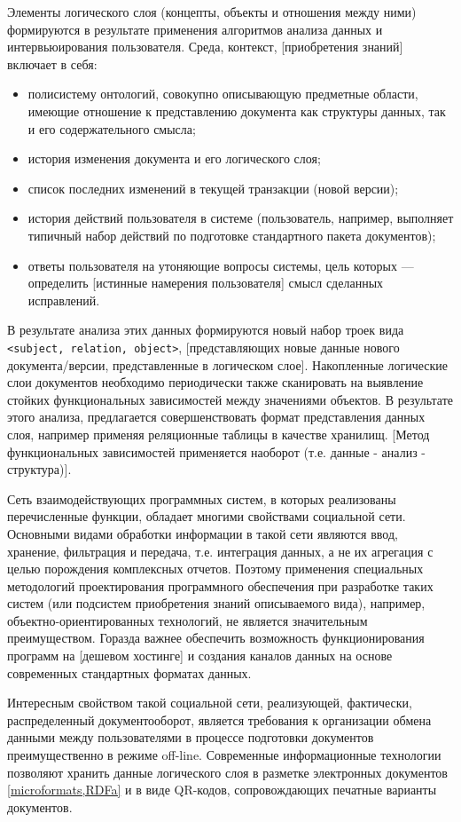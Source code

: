 \documentclass[utf8]{../IncArticle}
\begin{document}
Элементы логического слоя (концепты, объекты и отношения между ними)
формируются в результате применения алгоритмов анализа данных и
интервьюирования пользователя. Среда, контекст, [приобретения знаний]
включает в себя:
\begin{itemize}
\item полисистему онтологий, совокупно описывающую предметные области,
  имеющие отношение к представлению документа как структуры данных,
  так и его содержательного смысла;
\item история изменения документа и его логического слоя;
\item список последних изменений в текущей транзакции (новой версии);
\item история действий пользователя в системе (пользователь, например,
  выполняет типичный набор действий по подготовке стандартного пакета документов);
\item ответы пользователя на утоняющие вопросы системы, цель которых
  --- определить [истинные намерения пользователя] смысл сделанных исправлений.
\end{itemize}

В результате анализа этих данных формируются новый набор троек вида
\texttt{<subject, relation, object>}, [представляющих новые данные
нового документа/версии, представленные в логическом
слое]. Накопленные логические слои документов необходимо периодически
также сканировать на выявление стойких функциональных зависимостей
между значениями объектов. В результате этого анализа, предлагается
совершенствовать формат представления данных слоя, например применяя
реляционные таблицы в качестве хранилищ. [Метод функциональных
зависимостей применяется наоборот (т.е. данные - анализ - структура)].

Сеть взаимодействующих программных систем, в которых реализованы перечисленные функции,
обладает многими свойствами социальной сети. Основными видами обработки
информации в такой сети являются ввод, хранение, фильтрация и
передача, т.е. интеграция данных, а не их агрегация с целью порождения
комплексных отчетов. Поэтому применения специальных методологий
проектирования программного обеспечения при разработке таких систем
(или подсистем приобретения знаний описываемого вида), например,
объектно-ориентированных технологий, не является значительным
преимуществом. Горазда важнее обеспечить возможность функционирования
программ на [дешевом хостинге] и создания каналов данных на основе
современных стандартных форматах данных.

Интересным свойством такой социальной сети, реализующей, фактически,
распределенный документооборот, является требования к организации
обмена данными между пользователями в процессе подготовки документов
преимущественно в режиме off-line. Современные информационные
технологии позволяют хранить данные логического слоя в разметке
электронных документов \ref{microformats,RDFa} и в виде QR-кодов,
сопровождающих печатные варианты документов.
\end{document}
